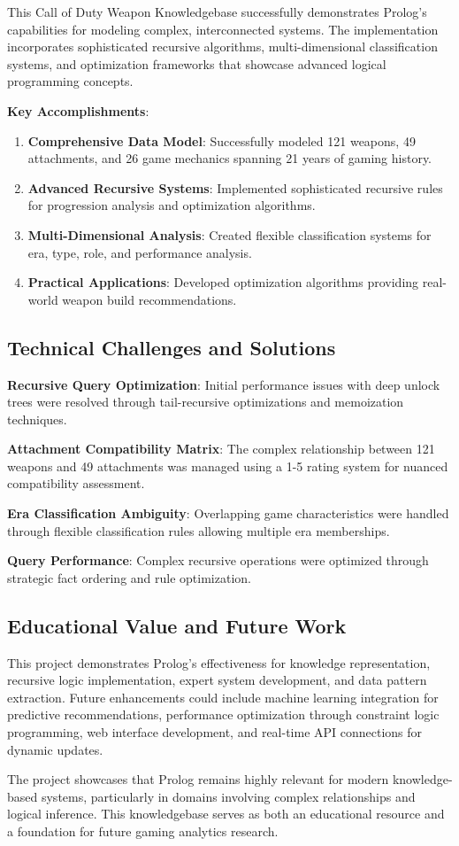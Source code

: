 \documentclass[12pt,a4paper]{article}
\begin{document}
This Call of Duty Weapon Knowledgebase successfully demonstrates Prolog's
capabilities for modeling complex, interconnected systems. The implementation
incorporates sophisticated recursive algorithms, multi-dimensional
classification systems, and optimization frameworks that showcase advanced
logical programming concepts.

\textbf{Key Accomplishments}:
\begin{enumerate}
    \item \textbf{Comprehensive Data Model}: Successfully modeled 121 weapons, 49 attachments, and 26 game mechanics spanning 21 years of gaming history.
    \item \textbf{Advanced Recursive Systems}: Implemented sophisticated recursive rules for progression analysis and optimization algorithms.
    \item \textbf{Multi-Dimensional Analysis}: Created flexible classification systems for era, type, role, and performance analysis.
    \item \textbf{Practical Applications}: Developed optimization algorithms providing real-world weapon build recommendations.
\end{enumerate}

\subsection{Technical Challenges and Solutions}

\textbf{Recursive Query Optimization}: Initial performance issues with deep unlock trees were resolved through tail-recursive optimizations and memoization techniques.

\textbf{Attachment Compatibility Matrix}: The complex relationship between 121 weapons and 49 attachments was managed using a 1-5 rating system for nuanced compatibility assessment.

\textbf{Era Classification Ambiguity}: Overlapping game characteristics were handled through flexible classification rules allowing multiple era memberships.

\textbf{Query Performance}: Complex recursive operations were optimized through strategic fact ordering and rule optimization.

\subsection{Educational Value and Future Work}

This project demonstrates Prolog's effectiveness for knowledge representation,
recursive logic implementation, expert system development, and data pattern
extraction. Future enhancements could include machine learning integration for
predictive recommendations, performance optimization through constraint logic
programming, web interface development, and real-time API connections for
dynamic updates.

The project showcases that Prolog remains highly relevant for modern
knowledge-based systems, particularly in domains involving complex
relationships and logical inference. This knowledgebase serves as both an
educational resource and a foundation for future gaming analytics research.
\end{document}
